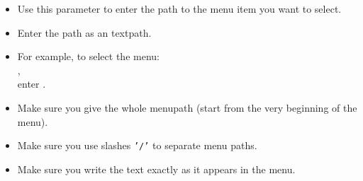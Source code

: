 \begin{itemize}
\item Use this parameter to enter the path to the menu item you want to select.
\item Enter the path as an textpath.
\item For example, to select the menu:\\ ,\\ enter .
\item Make sure you give the whole menupath (start from the very beginning of the menu).
\item Make sure you use slashes {\tt '/'} to separate menu paths.
\item Make sure you write the text exactly as it appears in the menu.
 
\end{itemize}

    
